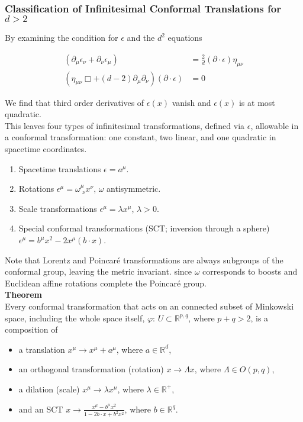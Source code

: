 \subsubsection*{Classification of Infinitesimal Conformal Translations for $d>2$}

\noindent By examining the condition for $\epsilon$ and the $d^2$ equations

\begin{align}
(\partial_\mu \epsilon_\nu + \partial_\nu \epsilon_\mu) &= \frac{2}{d} (\partial \cdot \epsilon) \eta_{\mu\nu} \\
(\eta_{\mu\nu} \Box + (d-2) \partial_\mu \partial_\nu) (\partial \cdot \epsilon) &= 0
\end{align}

\noindent We find that third order derivatives of $\epsilon(x)$ vanish and $\epsilon(x)$ is at most quadratic. \\

\noindent This leaves four types of infinitesimal transformations, defined via $\epsilon$, allowable in a conformal transformation: one constant, two linear, and one quadratic in spacetime coordinates.

\begin{enumerate}
\item Spacetime translations
	\subitem $\epsilon = a^\mu$.
\item Rotations
	\subitem  $\epsilon^\mu = \omega^\mu_{\,\,\nu} x^\nu$, $\omega$ antisymmetric.
\item Scale transformations
	\subitem $\epsilon^\mu = \lambda x^\mu$, $\lambda > 0$.
\item Special conformal transformations (SCT; inversion through a sphere)
	\subitem $\epsilon^\mu = b^\mu x^2 - 2 x^\mu (b \cdot x)$.
\end{enumerate}

\noindent Note that Lorentz and Poincar\'e transformations are always subgroups of the conformal group, leaving the metric invariant. since $\omega$ corresponds to boosts and Euclidean affine rotations complete the Poincar\'e group. \\

\noindent \textbf{Theorem} \\

\noindent Every conformal transformation that acts on an connected subset of Minkowski space, including the whole space itself, $\varphi : \, U \subset \mathbb{R}^{p,q}$, where $p+q > 2$, is a composition of 

\begin{itemize}
\item a translation
	\subitem $x^\mu \rightarrow x^\mu + a^\mu$, where $a \in \mathbb{R}^d$,
\item an orthogonal transformation (rotation)
	\subitem $x \rightarrow \Lambda x$, where $\Lambda \in O(p,q)$,
\item a dilation (scale)
	\subitem $x^\mu \rightarrow \lambda x^\mu$, where $\lambda \in \mathbb{R}^+$,
\item and an SCT
	\subitem $x \rightarrow \frac{x^\mu - b^\mu x^2 }{1-2b \cdot x + b^2 x^2}$, where $b \in \mathbb{R}^q$.
\end{itemize}

